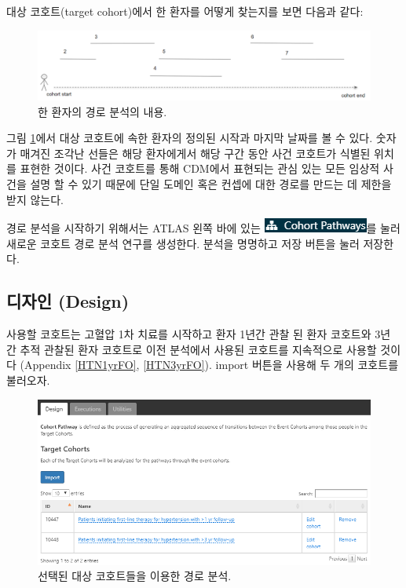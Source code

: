 \documentclass[11pt]{book}
\theoremstyle{definition}
\theoremstyle{definition}
\theoremstyle{definition}
\theoremstyle{remark}
\begin{document}
대상 코호트(target cohort)에서 한 환자를 어떻게 찾는지를 보면 다음과
같다:

\begin{figure}

{\centering \includegraphics[width=1\linewidth]{images/Characterization/pathwaysPersonEventView} 

}

\caption{한 환자의 경로 분석의 내용.}\label{fig:pathwaysPersonEventView}
\end{figure}

그림 \ref{fig:pathwaysPersonEventView}에서 대상 코호트에 속한 환자의
정의된 시작과 마지막 날짜를 볼 수 있다. 숫자가 매겨진 조각난 선들은 해당
환자에게서 해당 구간 동안 사건 코호트가 식별된 위치를 표현한 것이다.
사건 코호트를 통해 CDM에서 표현되는 관심 있는 모든 임상적 사건을 설명 할
수 있기 때문에 단일 도메인 혹은 컨셉에 대한 경로를 만드는 데 제한을 받지
않는다.

경로 분석을 시작하기 위해서는 ATLAS 왼쪽 바에 있는
\includegraphics{images/Characterization/atlasPathwaysMenuItem.png}를
눌러 새로운 코호트 경로 분석 연구를 생성한다. 분석을 명명하고 저장
버튼을 눌러 저장한다.

\subsection{디자인 (Design)}\label{-design-1}

사용할 코호트는 고혈압 1차 치료를 시작하고 환자 1년간 관찰 된 환자
코호트와 3년 간 추적 관찰된 환자 코호트로 이전 분석에서 사용된 코호트를
지속적으로 사용할 것이다 (Appendix \ref{HTN1yrFO}, \ref{HTN3yrFO}).
import 버튼을 사용해 두 개의 코호트를 불러오자.

\begin{figure}

{\centering \includegraphics[width=1\linewidth]{images/Characterization/atlasPathwaysTargetCohorts} 

}

\caption{선택된 대상 코호트들을 이용한 경로 분석.}\label{fig:atlasPathwaysTargetCohorts}
\end{figure}
\end{document}
